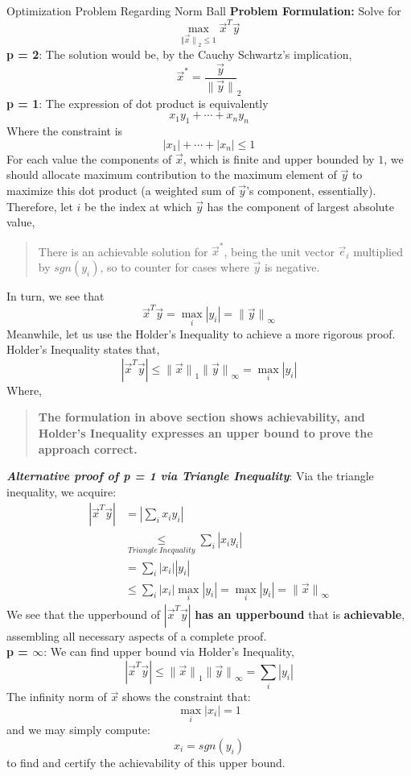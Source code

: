\begin{ln-explain}{Optimization Problem Regarding Norm Ball}{}
    \textbf{Problem Formulation:} Solve for \[\max_{{\Vert \vec{x} \rVert}_2 \leq 1} \vec{x}^T \vec{y}\]
    \tcblower
    \textbf{p = 2}: The solution would be, by the Cauchy Schwartz's implication,
    \[\vec{x}^* = \frac{\vec{y}}{\lVert \vec{y} \rVert}_2\]
    \textbf{p = 1}: The expression of dot product is equivalently
    \[x_1 y_1 + \cdots + x_n y_n\]
    Where the constraint is
    \[|x_1| + \cdots + |x_n| \leq 1\]
    For each value the components of $\vec{x}$, which is finite and upper bounded by $1$, we should allocate maximum contribution to the maximum element of $\vec{y}$ to maximize this dot product (a weighted sum of $\vec{y}$'s component, essentially). \\
    Therefore, let $i$ be the index at which $\vec{y}$ has the component of largest absolute value,
    \begin{quote}
        There is an achievable solution for $\vec{x}^*$, being the unit vector $\vec{e}_i$ multiplied by $sgn(y_i)$, so to counter for cases where $\vec{y}$ is negative.
    \end{quote}
    \par
    In turn, we see that
    \[\vec{x}^T \vec{y} = \max_i |y_i| = {\lVert \vec{y} \rVert}_\infty\]
    Meanwhile, let us use the Holder's Inequality to achieve a more rigorous proof. Holder's Inequality states that,
    \[
        |\vec{x}^T \vec{y}| \leq {\lVert \vec{x} \rVert}_1 {\lVert \vec{y} \rVert}_\infty = \max_i |y_i|
    \]
    Where,
    \begin{quote}
        \textbf{The formulation in above section shows achievability, and Holder's Inequality expresses an upper bound to prove the approach correct.}
    \end{quote}
    \textbf{\textit{Alternative proof of p = 1 via Triangle Inequality}}: Via the triangle inequality, we acquire:
    \begin{align*}
        |\vec{x}^T \vec{y}| &= |\sum_i x_i y_i| \\
        &\underset{Triangle\ Inequality}{\leq} \sum_i |x_i y_i| \\
        &= \sum_i |x_i||y_i| \\
        &\leq \sum_i |x_i| \max_i |y_i| = \max_i |y_i| = {\lVert \vec{x} \rVert}_\infty
    \end{align*}
    We see that the upperbound of $|\vec{x}^T \vec{y}|$ \textbf{has an upperbound} that is \textbf{achievable}, assembling all necessary aspects of a complete proof. \\
    \textbf{p = $\infty$}: We can find upper bound via Holder's Inequality,
    \[
        |\vec{x}^T \vec{y}| \leq {\lVert \vec{x} \rVert}_1 {\lVert \vec{y} \rVert}_\infty = \sum_i |y_i|
    \]
    The infinity norm of $\vec{x}$ shows the constraint that:
    \[
        \max_i |x_i| = 1
    \]
    and we may simply compute:
    \[
        x_i = sgn(y_i)
    \]
    to find and certify the achievability of this upper bound.
\end{ln-explain}

